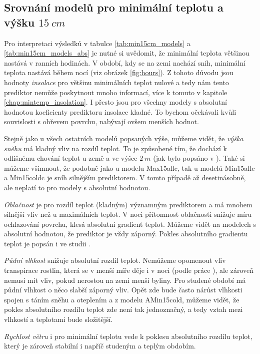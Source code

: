 \subsection{Srovnání modelů pro minimální teplotu a výšku $\SI{15}{cm}$}
Pro interpretaci výsledků v tabulce \ref{tab:min15cm_models} a \ref{tab:min15cm_models_abs} je nutné si uvědomit, že minimální teplota většinou nastává v ranních hodinách. V období, kdy se na zemi nachází sníh, minimální teplota nastává během nocí (viz obrázek \ref{fig:hours}). Z tohoto důvodu jsou hodnoty \textit{insolace} pro většinu minimálních teplot nulové a tedy nám tento prediktor nemůže poskytnout mnoho informací, více k tomuto v kapitole \ref{chap:mintemp_insolation}. I přesto jsou pro všechny modely s absolutní hodnotou koeficienty prediktoru insolace kladné. To bychom očekávali kvůli souvislosti s ohřevem povrchu, nabývají ovšem menších hodnot.

Stejně jako u všech ostatních modelů popsaných výše, můžeme vidět, že \textit{výška sněhu} má kladný vliv na rozdíl teplot. To je způsobené tím, že dochází k odlišnému chování teplot u země a ve výšce $\SI{2}{m}$ (jak bylo popsáno v \cite{snow_deFrenneForestMicroclimates}). Také si můžeme všimnout, že podobně jako u modelu Max15allc, tak u modelů Min15allc a Min15coldc je sníh silnějším prediktorem. V tomto případě až desetinásobně, ale neplatí to pro modely s absolutní hodnotou.

\textit{Oblačnost} je pro rozdíl teplot (kladným) významným prediktorem a má mnohem silnější vliv než u maximálních teplot. V noci přítomnost oblačnosti snižuje míru ochlazování povrchu, klesá absolutní gradient teplot. Můžeme vidět na modelech s absolutní hodnotou, že prediktor je vždy záporný. Pokles absolutního gradientu teplot je popsán i ve studii \cite{cloud_overwinteringclusters}. 

\textit{Půdní vlhkost} snižuje absolutní rozdíl teplot. Nemůžeme opomenout vliv transpirace rostlin, která se v menší míře děje i v noci (podle práce \cite{nighttranspiration}), ale zároveň nemusí mít vliv, pokud nerostou na zemi menší byliny. Pro studené období má půdní vlhkost o něco slabší záporný vliv. Opět zde bude často nárůst vlhkosti spojen s táním sněhu a oteplením a z modelu AMin15cold, můžeme vidět, že pokles absolutního rozdílu teplot zde není tak jednoznačný, a tedy vztah mezi vlhkostí a teplotami bude složitější.

\textit{Rychlost větru} i pro minimální teplotu vede k poklesu absolutního rozdílu teplot, který je zároveň stabilní i napříč studeným a teplým obdobím.

